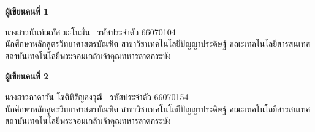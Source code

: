 \noindent
\textbf{ผู้เขียนคนที่ 1}

\noindent
นางสาวนันท์ณภัส มะโนมั่น \ รหัสประจำตัว 66070104 \\
นักศึกษาหลักสูตรวิทยาศาสตรบัณฑิต สาขาวิชาเทคโนโลยีปัญญาประดิษฐ์ คณะเทคโนโลยีสารสนเทศ สถาบันเทคโนโลยีพระจอมเกล้าเจ้าคุณทหารลาดกระบัง

\vskip1cm

\noindent
\textbf{ผู้เขียนคนที่ 2}

\noindent
นางสาวภาดาวัน โชติหิรัญคงวุฒิ \ รหัสประจำตัว 66070154 \\
นักศึกษาหลักสูตรวิทยาศาสตรบัณฑิต สาขาวิชาเทคโนโลยีปัญญาประดิษฐ์ คณะเทคโนโลยีสารสนเทศ สถาบันเทคโนโลยีพระจอมเกล้าเจ้าคุณทหารลาดกระบัง
